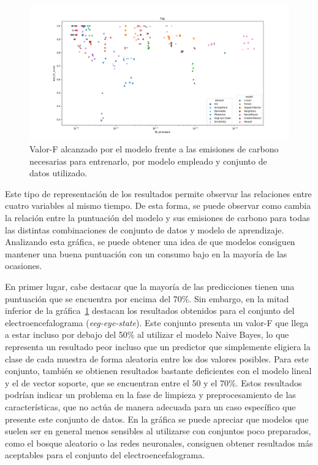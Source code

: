\begin{figure}[H]
  \centerline{
     \includegraphics[width=1.3\textwidth, keepaspectratio]{img/graph/4scatter-dataset-model.png}
  }
  \caption{Valor-F alcanzado por el modelo frente a las emisiones de carbono necesarias para entrenarlo, por modelo empleado y conjunto de datos utilizado.}
  \label{fig:scatter-1}
\end{figure}

Este tipo de representación de los resultados permite observar las relaciones entre cuatro variables al mismo tiempo. De esta forma, se puede observar como cambia la relación entre la puntuación del modelo y sus emisiones de carbono para todas las distintas combinaciones de conjunto de datos y modelo de aprendizaje. Analizando esta gráfica, se puede obtener una idea de que modelos consiguen mantener una buena puntuación con un consumo bajo en la mayoría de las ocasiones.

En primer lugar, cabe destacar que la mayoría de las predicciones tienen una puntuación que se encuentra por encima del 70\%. Sin embargo, en la mitad inferior de la gráfica~\ref{fig:scatter-1} destacan los resultados obtenidos para el conjunto del electroencefalograma (\emph{eeg-eye-state}). Este conjunto presenta un valor-F que llega a estar incluso por debajo del 50\% al utilizar el modelo Naive Bayes, lo que representa un resultado peor incluso que un predictor que simplemente eligiera la clase de cada muestra de forma aleatoria entre los dos valores posibles. Para este conjunto, también se obtienen resultados bastante deficientes con el modelo lineal y el de vector soporte, que se encuentran entre el 50 y el 70\%. Estos resultados podrían indicar un problema en la fase de limpieza y preprocesamiento de las características, que no actúa de manera adecuada para un caso específico que presente este conjunto de datos. En la gráfica se puede apreciar que modelos que suelen ser en general menos sensibles al utilizarse con conjuntos poco preparados, como el bosque aleatorio o las redes neuronales, consiguen obtener resultados más aceptables para el conjunto del electroencefalograma.

